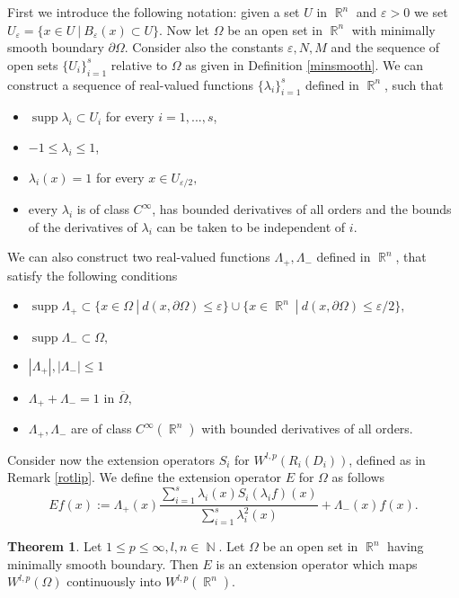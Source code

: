 \documentclass[12pt]{article}
\theoremstyle{definition}
\newtheorem{theorem}{Theorem}
\DeclareMathOperator\supp{supp}
\DeclareMathOperator\rr{\mathbb{R}}
\DeclareMathOperator\nn{\mathbb{N}}
\begin{document}
First we introduce the following notation: given a set $U$ in $\rr^n$ and  $\varepsilon >0$ we set $U_\varepsilon=\{ x 	\in U \ | \ B_\varepsilon(x) \subset U\}$. Now let $\Omega$ be an open set in $\rr^n$ with minimally smooth boundary $\partial \Omega$. Consider also the constants $\varepsilon,N,M$ and the sequence of open sets  $\{U_i\}_{i=1}^s$ relative to $\Omega$ as given in Definition \ref{minsmooth}. We can construct a sequence of real-valued functions $\{\lambda_i\}_{i=1}^s$ defined in $\rr^n$, such that
\begin{itemize}
	\item $\supp \lambda_i \subset U_i$ for every $i=1,...,s$,
	\item $-1\le \lambda_i\le 1$,
	\item $\lambda_i(x)=1$ for every $x \in U_{\varepsilon/2},$
	\item every $\lambda_i$ is of class $C^\infty$, has bounded derivatives of all orders and the bounds of the derivatives of $\lambda_i$ can be taken to be independent of $i.$
\end{itemize}
We can also construct two real-valued functions $\Lambda_+,\Lambda_-$ defined in $\rr^n$, that satisfy the following conditions
\begin{itemize}
	\item $\supp \Lambda_+ \subset   \{ x \in \Omega \ | \ d(x,\partial \Omega)\le \varepsilon \}\cup \{ x \in \rr^n \ | \ d(x,\partial \Omega)\le \varepsilon /2\},$
	\item $\supp \Lambda_- \subset \Omega,$
	\item $|\Lambda_+|,|\Lambda_-|\le 1$
	\item $\Lambda_++\Lambda_- =1 $ in $\overline \Omega,$
	\item $\Lambda_+,\Lambda_-$ are of class $C^\infty(\rr^n)$ with bounded derivatives of all orders.
\end{itemize}
Consider now the extension operators $S_i$ for $W^{l,p}(R_i(D_i))$, defined as in Remark \ref{rotlip}. We define the extension operator $E$ for $\Omega$ as follows
\begin{equation} 
Ef(x):= \Lambda_+(x)\frac{\sum_{i=1}^s\lambda_i(x)S_i(\lambda_if)(x)}{\sum_{i=1}^s \lambda^2_i(x)}+\Lambda_-(x)f(x). \label{defEE}
\end{equation}

\begin{theorem}\label{Eteor}
Let $1\le p\le \infty, l,n \in \nn$. Let $\Omega$ be an open set in $\rr^n$ having minimally smooth boundary. Then $E$ is an extension operator which maps $W^{l,p}(\Omega)$ continuously into $W^{l,p}(\rr^n).$
\end{theorem}
\end{document}
